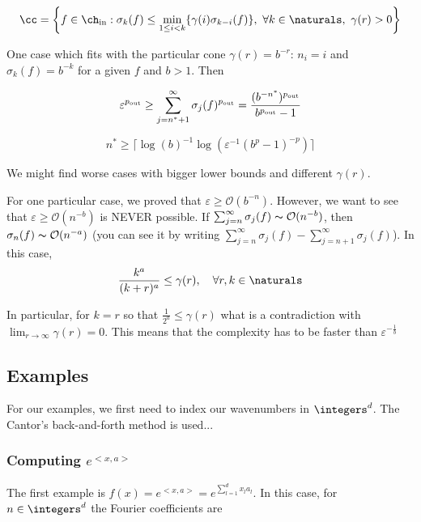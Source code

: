 \documentclass[final]{elsarticle}
\newcommand{\chin}{\ch_{\text{\rm{in}}}}
\newcommand{\pout}{p_{\text{\rm{out}}}}
\newcommand{\co}{\mathcal{O}}
\theoremstyle{definition}
\theoremstyle{remark}
\begin{document}
\begin{equation}
\cc = \left\{ f \in \chin : \sigma_k(f) \le \min_{1 \le i < k}\{\gamma(i)\sigma_{k-i}(f)\}, \ \forall k \in \naturals, \ \gamma(r) > 0 \right\}
\end{equation}

One case which fits with the particular cone $\gamma(r)=b^{-r}$: $n_i=i$ and $\sigma_{k}(f)=b^{-k}$ for a given $f$ and $b>1$. Then

\begin{equation*}
\varepsilon^{\pout} \ge \sum_{j=n^*+1}^{\infty}\sigma_{j}(f)^{\pout} = \frac{(b^{-n^*})^{\pout}}{b^{\pout}-1}
\end{equation*}

\begin{equation}
n^* \ge \lceil\log(b)^{-1}\log(\varepsilon^{-1}(b^p-1)^{-p})\rceil
\end{equation}

We might find worse cases with bigger lower bounds and different $\gamma(r)$.

For one particular case, we proved that $\varepsilon\ge\co(b^{-n})$. However, we want to see that $\varepsilon\ge\co(n^{-b})$ is NEVER possible.
If $\sum_{j=n}^{\infty}\sigma_{j}(f)\thicksim\co(n^{-b})$, then $\sigma_{n}(f)\thicksim\co(n^{-a})$ (you can see it by writing $\sum_{j=n}^{\infty}\sigma_{j}(f)-\sum_{j=n+1}^{\infty}\sigma_{j}(f)$). In this case,
\begin{equation*}
\frac{k^a}{(k+r)^a} \le \gamma(r),\quad \forall r,k\in\naturals
\end{equation*}

In particular, for $k=r$ so that $\frac{1}{2^a}\le\gamma(r)$ what is a contradiction with $\lim_{r\rightarrow\infty}\gamma(r)=0$. This means that the complexity has to be faster than $\varepsilon^{-\frac{1}{b}}$

\subsection{Examples}

For our examples, we first need to index our wavenumbers in $\integers^d$. The Cantor's back-and-forth method is used...

\subsubsection{Computing $e^{<x,a>}$}

The first example is $f(x)=e^{<x,a>}=e^{\sum_{l=1}^dx_la_l}$. In this case, for $n\in\integers^d$ the Fourier coefficients are
\end{document}
